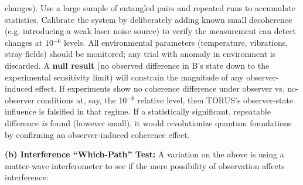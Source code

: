 \documentclass[]{article}
\newcommand{\superscript}[1]{\ensuremath{^{\mathrm{#1}}}}
\begin{document}
\begin{enumerate}
  changes)​. Use a large sample of entangled pairs and repeated runs to
  accumulate statistics. Calibrate the system by deliberately adding
  known small decoherence (e.g. introducing a weak laser noise source)
  to verify the measurement can detect changes at $10\superscript{−6}$
  levels. All environmental parameters (temperature, vibrations, stray
  fields) should be monitored; any trial with anomaly in environment is
  discarded. A \textbf{null result} (no observed difference in B's state
  down to the experimental sensitivity limit) will constrain the
  magnitude of any observer-induced effect. If experiments show no
  coherence difference under observer vs. no-observer conditions at,
  say, the $10\superscript{−8}$ relative level, then TORUS's observer-state
  influence is falsified in that regime​. If a statistically
  significant, repeatable difference \emph{is} found (however small), it
  would revolutionize quantum foundations by confirming an
  observer-induced coherence effect​.
\end{enumerate}

\textbf{(b) Interference ``Which-Path'' Test:} A variation on the above
is using a matter-wave interferometer to see if the mere possibility of
observation affects interference:
\end{document}
